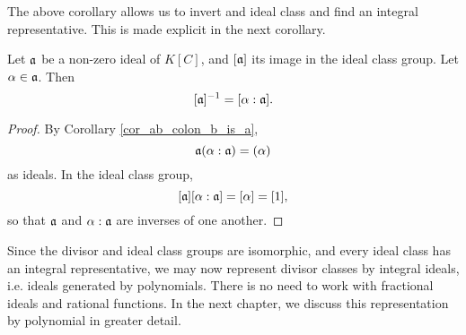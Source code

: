 The above corollary allows us to invert and ideal class and find an integral representative.
This is made explicit in the next corollary.

\begin{corollary}
  Let $\frak a$ be a non-zero ideal of $K[C]$,
  and $[\frak a]$ its image in the ideal class group.
  Let $\alpha \in \frak a$. Then
  \[ [\frak a]^{-1} = [\alpha : \frak a]. \]
\end{corollary}
\begin{proof}
  By Corollary \ref{cor_ab_colon_b_is_a},
  \[ \frak a(\alpha : \frak a) = (\alpha) \]
  as ideals.
  In the ideal class group,
  \[ [\frak a][\alpha : \frak a] = [\alpha] = [1], \]
  so that $\frak a$ and $\alpha : \frak a$ are inverses of one another.
\end{proof}

Since the divisor and ideal class groups are isomorphic, and every ideal class has an integral representative,
we may now represent divisor classes by integral ideals, i.e. ideals generated by polynomials.
There is no need to work with fractional ideals and rational functions.
In the next chapter, we discuss this representation by polynomial in greater detail.
